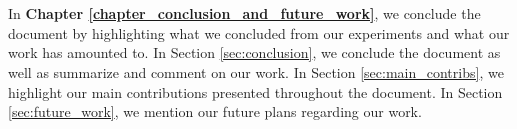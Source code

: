 \\ \\In \textbf{Chapter \ref{chapter_conclusion_and_future_work}}, we conclude the document by highlighting what we concluded from our experiments and what our work has amounted to. In Section \ref{sec:conclusion}, we conclude the document as well as summarize and comment on our work. In Section \ref{sec:main_contribs}, we highlight our main contributions presented throughout the document. In Section \ref{sec:future_work}, we mention our future plans regarding our work.